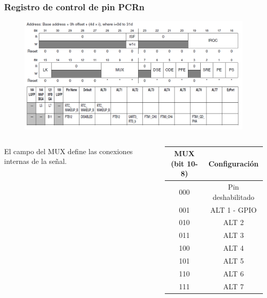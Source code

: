 \documentclass[10.5pt,scale=1.0,t,aspectratio=169,hyperref={pdfpagelabels=false}]{beamer}
\begin{document}
\begin{frame}
	\frametitle{Registro de control de pin PCRn}
	\begin{figure}
		\centering
		\includegraphics[scale=0.4]{09_PCR}
	\end{figure}
	\begin{columns}
		El campo del MUX define las conexiones internas de la señal.
		\begin{scriptsize}
			\begin{tabular}{ cc } 
				\hline
				\textbf{MUX (bit 10-8)} & \textbf{Configuración}  \\ 
				\hline
				000 & Pin deshabilitado  \\ 
				001 & ALT 1 - GPIO \\ 
				010 & ALT 2 \\ 
				011 & ALT 3 \\ 
				100 & ALT 4 \\ 
				101 & ALT 5 \\ 
				110 & ALT 6 \\ 
				111 & ALT 7 \\ 
				\hline
			\end{tabular}
		\end{scriptsize}
	\end{columns}
\end{frame}
\end{document}
